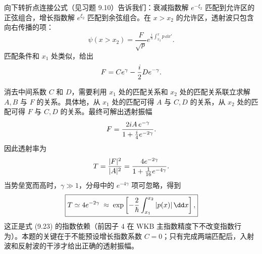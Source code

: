 \begin{solution}
向下转折点连接公式（见习题 9.10）告诉我们：衰减指数解 $e^{-\xi_2}$ 匹配到允许区的正弦组合，增长指数解 $e^{\xi_2}$ 匹配到余弦组合。在 $x>x_2$ 的允许区，透射波只包含向右传播的项：
\[
\psi(x>x_2)=\frac{F}{\sqrt{p}}e^{\frac{i}{\hbar}\int_{x_2}^x p\,\dd x'}.
\]
匹配条件和 $x_1$ 处类似，给出
\[
F = Ce^{\gamma}-{i\over2}De^{-\gamma}.
\]

消去中间系数 $C$ 和 $D$，需要利用 $x_1$ 处的匹配关系和 $x_2$ 处的匹配关系联立求解 $A,B$ 与 $F$ 的关系。具体地，从 $x_1$ 处的匹配可得 $A$ 与 $C,D$ 的关系，从 $x_2$ 处的匹配可得 $F$ 与 $C,D$ 的关系。最终可解出透射振幅
\[
F = {2iA\,e^{-\gamma}\over 1+{i\over4}e^{-2\gamma}}.
\]
因此透射率为
\[
T={|F|^2\over|A|^2}
={4e^{-2\gamma}\over 1+{1\over16}e^{-4\gamma}}.
\]
当势垒宽而高时，$\gamma\gg1$，分母中的 $e^{-4\gamma}$ 项可忽略，得到
\[
\boxed{T\simeq 4e^{-2\gamma}
\;\approx\; \exp\left[-{2\over\hbar}\int_{x_1}^{x_2}|p(x)|\,\dd x\right],}
\]
这正是式 (9.23) 的指数依赖（前因子 $4$ 在 WKB 主指数精度下不改变指数行为）。本题的关键在于不能预设增长指数系数 $C=0$；只有完成两端匹配后，入射波和反射波的干涉才给出正确的透射振幅。
\end{solution}

